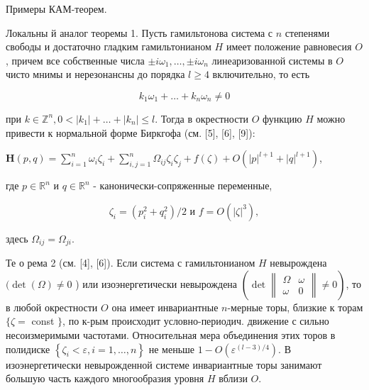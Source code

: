 \documentclass[10pt]{article}
\begin{document}
Примеры КАМ-теорем.



Локальны й аналог теоремы 1. Пусть гамильтонова система с $n$ степенями свободы и достаточно гладким гамильтонианом $H$ имеет положение равновесия $O$, причем все собственные числа $\pm i \omega_{1}, \ldots, \pm i \omega_{n}$ линеаризованной системы в $O$ чисто мнимы и нерезонансны до порядка $l \geqslant 4$ включительно, то есть



\[

k_{1} \omega_{1}+\ldots+k_{n} \omega_{n} \neq 0

\]



при $k \in \mathbb{Z}^{n}, 0<\left|k_{1}\right|+\ldots+\left|k_{n}\right| \leqslant l$. Тогда в окрестности $O$ функцию $H$ можно привести к нормальной форме Биркгофа (см. [5], [6], [9]):



$\boldsymbol{H}(p, q)=\sum_{i=1}^{n} \omega_{i} \zeta_{i}+\sum_{i, j=1}^{n} \Omega_{i j} \zeta_{i} \zeta_{j}+f(\zeta)+O\left(|p|^{l+1}+|q|^{l+1}\right)$,



где $p \in \mathbb{R}^{n}$ и $q \in \mathbb{R}^{n}$ - канонически-сопряженные переменные,



\[

\zeta_{i}=\left(p_{i}^{2}+q_{i}^{2}\right) / 2 \text { и } f=O\left(|\zeta|^{3}\right),

\]



здесь $\Omega_{i j}=\Omega_{j i}$.



Те о рема 2 (см. [4], [6]). Если система с гамильтонианом $H$ невырождена $(\operatorname{det}(\Omega) \neq 0$ ) или изоэнергетически невырождена $\left(\operatorname{det}\left\|\begin{array}{cc}\Omega & \omega \\ \omega & 0\end{array}\right\| \neq 0\right)$, то в любой окрестности $O$ она имеет инвариантные $n$-мерные торы, близкие к торам $\{\zeta=$ const $\}$, по к-рым происходит условно-периодич. движение с сильно несоизмеримыми частотами. Относительная мера объединения этих торов в полидиске $\left\{\zeta_{i}<\varepsilon, i=1, \ldots, n\right\}$ не меньше $1-O\left(\varepsilon^{(l-3) / 4}\right)$. В изоэнергетически невырожденной системе инвариантные торы занимают большую часть каждого многообразия уровня $H$ вблизи $O$.
\end{document}
